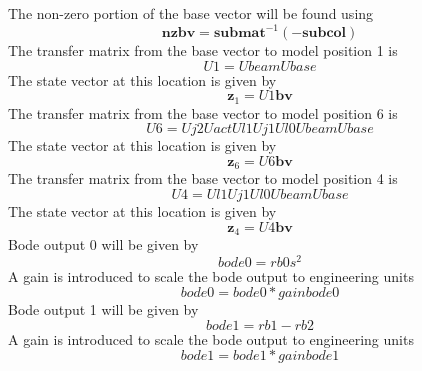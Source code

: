 \documentclass[12pt]{article}
\newcommand{\M}[1]{\mathbf{#1}}
\begin{document}
The non-zero portion of the base vector will be found using
\begin{equation}
\M{nzbv}=\M{submat}^{-1}\left(-\M{subcol}\right)
\end{equation}
The transfer matrix from the base vector to model position 1 is
\begin{equation}
	U1=Ubeam Ubase
\end{equation}
The state vector at this location is given by
\begin{equation}
	\M{z}_{1}=U1 \M{bv}
\end{equation}
The transfer matrix from the base vector to model position 6 is
\begin{equation}
	U6=Uj2 Uact Ul1 Uj1 Ul0 Ubeam Ubase
\end{equation}
The state vector at this location is given by
\begin{equation}
	\M{z}_{6}=U6 \M{bv}
\end{equation}
The transfer matrix from the base vector to model position 4 is
\begin{equation}
	U4=Ul1 Uj1 Ul0 Ubeam Ubase
\end{equation}
The state vector at this location is given by
\begin{equation}
	\M{z}_{4}=U4 \M{bv}
\end{equation}
Bode output 0 will be given by
\begin{equation}
	bode0=rb0 s^2
\end{equation}
A gain is introduced to scale the bode output to engineering units
\begin{equation}
	bode0=bode0*gainbode0
\end{equation}
Bode output 1 will be given by
\begin{equation}
	bode1=rb1-rb2
\end{equation}
A gain is introduced to scale the bode output to engineering units
\begin{equation}
	bode1=bode1*gainbode1
\end{equation}
\end{document}
